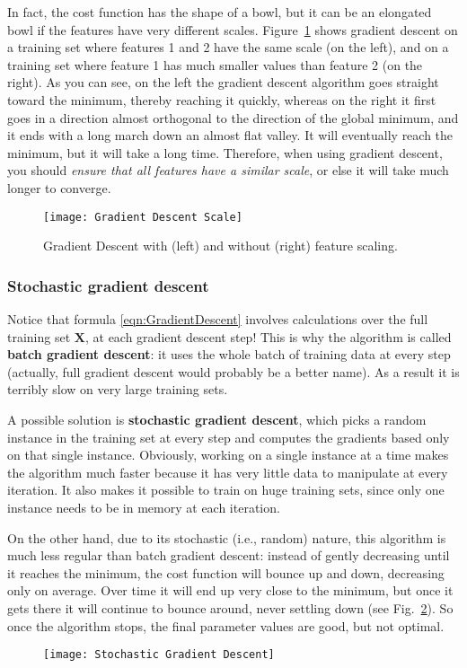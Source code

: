 In fact, the cost function has the shape of a bowl, but it can be an elongated bowl if the features have very different scales. Figure~\ref{GradientDescentScale} shows gradient descent on a training set where features 1 and 2 have the same scale (on the left), and on a training set where feature 1 has much smaller values than feature 2 (on the right). As you can see, on the left the gradient descent algorithm goes straight toward the minimum, thereby reaching it quickly, whereas on the right it first goes in a direction almost orthogonal to the direction of the global minimum, and it ends with a long march down an almost flat valley. It will eventually reach the minimum, but it will take a long time. Therefore, when using gradient descent, you should \emph{ensure that all features have a similar scale}, or else it will take much longer to converge.
\begin{figure}[h!t]
\centering
\texttt{[image: Gradient Descent Scale]}
\caption{Gradient Descent with (left) and without (right) feature scaling.}\label{GradientDescentScale}
\end{figure}
\subsubsection{Stochastic gradient descent}
Notice that formula \eqref{eqn:GradientDescent} involves calculations over the full training set $\mathbf{X}$, at each gradient descent step! This is why the algorithm is called \textbf{batch gradient descent}: it uses the whole batch of training data at every step (actually, full gradient descent would probably be a better name). As a result it is terribly slow on very large training sets.

A possible solution is \textbf{stochastic gradient descent}, which picks a random instance in the training set at every step and computes the gradients based only on that single instance. Obviously, working on a single instance at a time makes the algorithm much faster because it has very little data to manipulate at every iteration. It also makes it possible to train on huge training sets, since only one instance needs to be in memory at each iteration.

On the other hand, due to its stochastic (i.e., random) nature, this algorithm is much less regular than batch gradient descent: instead of gently decreasing until it reaches the minimum, the cost function will bounce up and down, decreasing only on average. Over time it will end up very close to the minimum, but once it gets there it will continue to bounce around, never settling down (see Fig.~\ref{StochasticGradientDescent}). So once the algorithm stops, the final parameter values are good, but not optimal.
\begin{figure}[h!t]
\centering
\texttt{[image: Stochastic Gradient Descent]}
\caption{}\label{StochasticGradientDescent}
\end{figure}

